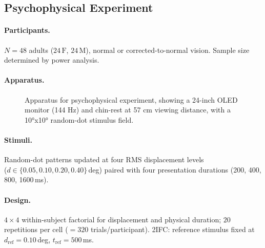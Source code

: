 \documentclass[11pt]{article}
\begin{document}
\subsection{Psychophysical Experiment}

\paragraph{Participants.}
$N=48$ adults ($24\,\mathrm{F}$, $24\,\mathrm{M}$), normal or
corrected-to-normal vision.  Sample size determined by power analysis.

\paragraph{Apparatus.}
\begin{figure}[ht]
\centering
{}
\caption{Apparatus for psychophysical experiment, showing a 24-inch OLED monitor (144 Hz) and chin-rest at 57 cm viewing distance, with a 10°x10° random-dot stimulus field.}
\label{fig:apparatus}
\end{figure}

\paragraph{Stimuli.}
Random-dot patterns updated at four RMS displacement levels \\
($d \in \{0.05,\allowbreak 0.10,\allowbreak 0.20,\allowbreak 0.40\}$\,deg) paired with four presentation durations (200, 400, 800, 1600\,ms).

\paragraph{Design.}
$4\times4$ within-subject factorial for displacement and physical
duration; $20$ repetitions per cell ($=320$ trials\slash participant).
2IFC: reference stimulus fixed at $d_{\mathrm{ref}}=0.10$\,deg,
$t_{\mathrm{ref}}=500$\,ms.
\end{document}
